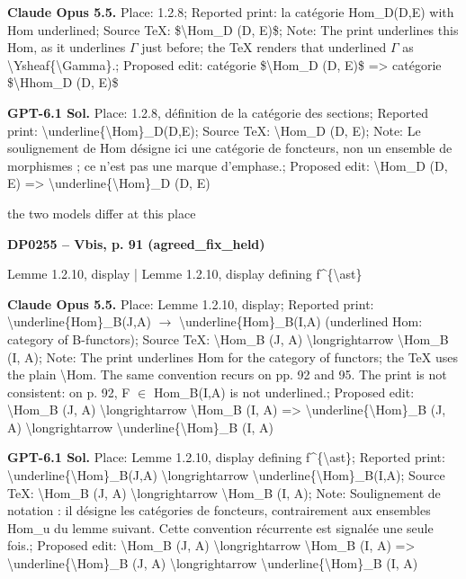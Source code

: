 \textbf{Claude Opus 5.5.} Place: 1.2.8; Reported print: la catégorie Hom\_D(D,E) with Hom underlined; Source TeX: \$\textbackslash{}Hom\_D (D, E)\$; Note: The print underlines this Hom, as it underlines \ensuremath{\Gamma} just before; the TeX renders that underlined \ensuremath{\Gamma} as \textbackslash{}Ysheaf\{\textbackslash{}Gamma\}.; Proposed edit: catégorie \$\textbackslash{}Hom\_D (D, E)\$ =\allowbreak > catégorie \$\textbackslash{}Hhom\_D (D, E)\$\par
\textbf{GPT-6.1 Sol.} Place: 1.2.8, définition de la catégorie des sections; Reported print: \textbackslash{}underline\{\textbackslash{}Hom\}\_D(D,E); Source TeX: \textbackslash{}Hom\_D (D, E); Note: Le soulignement de Hom désigne ici une catégorie de foncteurs, non un ensemble de morphismes ; ce n'est pas une marque d'emphase.; Proposed edit: \textbackslash{}Hom\_D (D, E) =\allowbreak > \textbackslash{}underline\{\textbackslash{}Hom\}\_D (D, E)\par
the two models differ at this place\par
\par\noindent\hypertarget{DP0255}{}\textbf{DP0255 -- Vbis, p. 91 (agreed\_fix\_held)}\par
Lemme 1.2.10, display | Lemme 1.2.10, display defining f\textasciicircum{}\{\textbackslash{}ast\}\par
\textbf{Claude Opus 5.5.} Place: Lemme 1.2.10, display; Reported print: \textbackslash{}underline\{Hom\}\_B(J,A) \ensuremath{\longrightarrow} \textbackslash{}underline\{Hom\}\_B(I,A) (underlined Hom: category of B-functors); Source TeX: \textbackslash{}Hom\_B (J, A) \textbackslash{}longrightarrow \textbackslash{}Hom\_B (I, A); Note: The print underlines Hom for the category of functors; the TeX uses the plain \textbackslash{}Hom. The same convention recurs on pp. 92 and 95. The print is not consistent: on p. 92, F \ensuremath{\in} Hom\_B(I,A) is not underlined.; Proposed edit: \textbackslash{}Hom\_B (J, A) \textbackslash{}longrightarrow \textbackslash{}Hom\_B (I, A) =\allowbreak > \textbackslash{}underline\{\textbackslash{}Hom\}\_B (J, A) \textbackslash{}longrightarrow \textbackslash{}underline\{\textbackslash{}Hom\}\_B (I, A)\par
\textbf{GPT-6.1 Sol.} Place: Lemme 1.2.10, display defining f\textasciicircum{}\{\textbackslash{}ast\}; Reported print: \textbackslash{}underline\{\textbackslash{}Hom\}\_B(J,A) \textbackslash{}longrightarrow \textbackslash{}underline\{\textbackslash{}Hom\}\_B(I,A); Source TeX: \textbackslash{}Hom\_B (J, A) \textbackslash{}longrightarrow \textbackslash{}Hom\_B (I, A); Note: Soulignement de notation : il désigne les catégories de foncteurs, contrairement aux ensembles Hom\_u du lemme suivant. Cette convention récurrente est signalée une seule fois.; Proposed edit: \textbackslash{}Hom\_B (J, A) \textbackslash{}longrightarrow \textbackslash{}Hom\_B (I, A) =\allowbreak > \textbackslash{}underline\{\textbackslash{}Hom\}\_B (J, A) \textbackslash{}longrightarrow \textbackslash{}underline\{\textbackslash{}Hom\}\_B (I, A)\par
